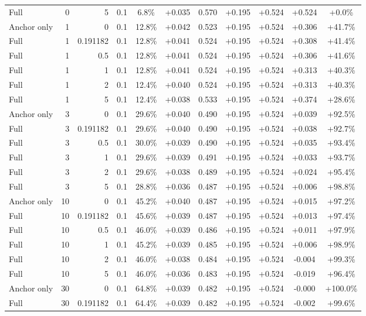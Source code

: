 \begin{table}[htbp]
\begin{tabular}{lrrrccccccc}
Full & 0 & 5 & 0.1 & 6.8\% & +0.035 & 0.570 & +0.195 & +0.524 & +0.524 & +0.0\% \\
Anchor only & 1 & 0 & 0.1 & 12.8\% & +0.042 & 0.523 & +0.195 & +0.524 & +0.306 & +41.7\% \\
Full & 1 & 0.191182 & 0.1 & 12.8\% & +0.041 & 0.524 & +0.195 & +0.524 & +0.308 & +41.4\% \\
Full & 1 & 0.5 & 0.1 & 12.8\% & +0.041 & 0.524 & +0.195 & +0.524 & +0.306 & +41.6\% \\
Full & 1 & 1 & 0.1 & 12.8\% & +0.041 & 0.524 & +0.195 & +0.524 & +0.313 & +40.3\% \\
Full & 1 & 2 & 0.1 & 12.4\% & +0.040 & 0.524 & +0.195 & +0.524 & +0.313 & +40.3\% \\
Full & 1 & 5 & 0.1 & 12.4\% & +0.038 & 0.533 & +0.195 & +0.524 & +0.374 & +28.6\% \\
Anchor only & 3 & 0 & 0.1 & 29.6\% & +0.040 & 0.490 & +0.195 & +0.524 & +0.039 & +92.5\% \\
Full & 3 & 0.191182 & 0.1 & 29.6\% & +0.040 & 0.490 & +0.195 & +0.524 & +0.038 & +92.7\% \\
Full & 3 & 0.5 & 0.1 & 30.0\% & +0.039 & 0.490 & +0.195 & +0.524 & +0.035 & +93.4\% \\
Full & 3 & 1 & 0.1 & 29.6\% & +0.039 & 0.491 & +0.195 & +0.524 & +0.033 & +93.7\% \\
Full & 3 & 2 & 0.1 & 29.6\% & +0.038 & 0.489 & +0.195 & +0.524 & +0.024 & +95.4\% \\
Full & 3 & 5 & 0.1 & 28.8\% & +0.036 & 0.487 & +0.195 & +0.524 & +0.006 & +98.8\% \\
Anchor only & 10 & 0 & 0.1 & 45.2\% & +0.040 & 0.487 & +0.195 & +0.524 & +0.015 & +97.2\% \\
Full & 10 & 0.191182 & 0.1 & 45.6\% & +0.039 & 0.487 & +0.195 & +0.524 & +0.013 & +97.4\% \\
Full & 10 & 0.5 & 0.1 & 46.0\% & +0.039 & 0.486 & +0.195 & +0.524 & +0.011 & +97.9\% \\
Full & 10 & 1 & 0.1 & 45.2\% & +0.039 & 0.485 & +0.195 & +0.524 & +0.006 & +98.9\% \\
Full & 10 & 2 & 0.1 & 46.0\% & +0.038 & 0.484 & +0.195 & +0.524 & -0.004 & +99.3\% \\
Full & 10 & 5 & 0.1 & 46.0\% & +0.036 & 0.483 & +0.195 & +0.524 & -0.019 & +96.4\% \\
Anchor only & 30 & 0 & 0.1 & 64.8\% & +0.039 & 0.482 & +0.195 & +0.524 & -0.000 & +100.0\% \\
Full & 30 & 0.191182 & 0.1 & 64.4\% & +0.039 & 0.482 & +0.195 & +0.524 & -0.002 & +99.6\% \\

\end{tabular}
\end{table}
